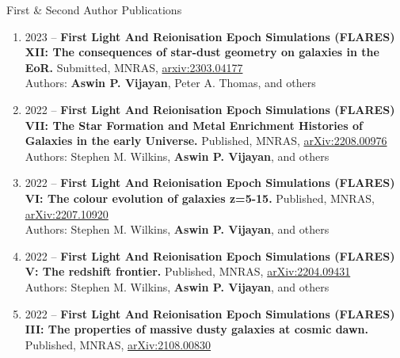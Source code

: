 \documentclass[a4paper,10pt]{resume} %
\begin{document}

\begin{rSection}{First \& Second Author Publications}
\begin{enumerate}
    \item {2023 -- \bf First Light And Reionisation Epoch Simulations (FLARES) XII: The consequences of star-dust geometry on galaxies in the EoR.} Submitted, MNRAS, \href{https://arxiv.org/abs/2303.04177}{\color{blue}arxiv:2303.04177}\\
    Authors: \textbf{Aswin P. Vijayan}, Peter A. Thomas, and others
    \item {2022 -- \bf First Light And Reionisation Epoch Simulations (FLARES) VII: The Star Formation and Metal
    Enrichment Histories of Galaxies in the early Universe.} Published, MNRAS, \href{https://arxiv.org/abs/2208.00976}{\color{blue} arXiv:2208.00976}\\
    Authors: Stephen M. Wilkins, \textbf{Aswin P. Vijayan}, and others
    \item {2022 -- \bf First Light And Reionisation Epoch Simulations (FLARES) VI: The colour evolution of galaxies z=5-15.} Published, MNRAS, \href{https://arxiv.org/abs/2207.10920}{\color{blue} arXiv:2207.10920}\\
    Authors: Stephen M. Wilkins, \textbf{Aswin P. Vijayan}, and others
    \item {2022 -- \bf First Light And Reionisation Epoch Simulations	(FLARES) V: The redshift frontier.} Published, MNRAS, \href{https://arxiv.org/abs/2204.09431}{\color{blue} arXiv:2204.09431}\\
    Authors: Stephen M. Wilkins, \textbf{Aswin P. Vijayan}, and others
    \item {2022 -- \bf First Light And Reionisation Epoch Simulations	(FLARES) III: The properties of massive dusty galaxies at cosmic dawn.} Published, MNRAS, \href{https://arxiv.org/abs/2108.00830}{\color{blue} arXiv:2108.00830}\\

\end{enumerate}
\end{rSection}
\end{document}
